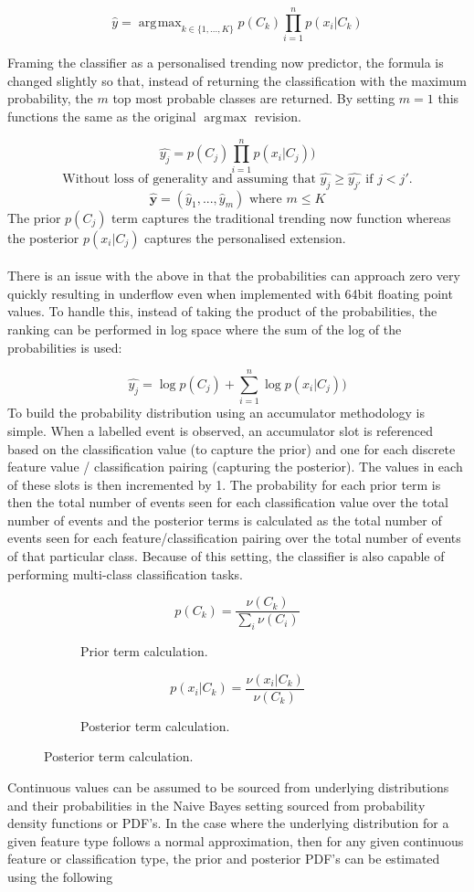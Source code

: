 \documentclass[a4paper,11pt]{scrreprt}
\DeclareMathOperator*{\argmax}{\arg\!\max}
\begin{document}
\[\hat{y}=\argmax_{k \in \{1,...,K\}} p(C_k)\prod_{i=1}^n p(x_i | C_k)\]

Framing the classifier as a personalised trending now predictor, the formula is changed slightly so that, instead of returning the classification with the maximum probability, the \(m\) top most probable classes are returned. By setting \(m=1\) this functions the same as the original \(\argmax\) revision. 

\[\hat{y_j}= p(C_j)\prod_{i=1}^n p(x_i | C_j))\]
\[\text{Without loss of generality and assuming that }  \hat{y_j} \geq \hat{y_{j'}} \text{ if } j < j'.\]
\[\mathbf{\hat{y}} = (\hat{y}_1, ..., \hat{y}_m) \text{ where } m \leq K\]
The prior \(p(C_j)\) term captures the traditional trending now function whereas the posterior \(p(x_i | C_j)\) captures the personalised extension.\\\\ There is an issue with the above in that the probabilities can approach zero very quickly resulting in underflow even when implemented with 64bit floating point values. To handle this, instead of taking the product of the probabilities, the ranking can be performed in log space where the sum of the log of the probabilities is used:

\[\hat{y_j}= \log p(C_j) + \sum_{i=1}^n \log p(x_i | C_j))\]
To build the probability distribution using an accumulator methodology is simple. When a labelled event is observed, an accumulator slot is referenced based on the classification value (to capture the prior) and one for each discrete feature value / classification pairing (capturing the posterior). The values in each of these slots is then incremented by 1. The probability for each prior term is then the total number of events seen for each classification value over the total number of events and the posterior terms is calculated as the total number of events seen for each feature/classification pairing over the total number of events of that particular class. Because of this setting, the classifier is also capable of performing multi-class classification tasks.

\begin{figure}[h!]
\begin{subfigure}[t]{2 in}
\[p(C_k) = \frac{\nu(C_k)}{\sum_{i} \nu(C_i)}\]
\caption{Prior term calculation.}
\end{subfigure}
\begin{subfigure}[t]{2 in}
\[p(x_i | C_k) = \frac{\nu(x_i | C_k)}{\nu(C_k)}\]
\caption{Posterior term calculation.}
\end{subfigure}
\end{figure}
Continuous values can be assumed to be sourced from underlying distributions and their probabilities in the Naive Bayes setting sourced from probability density functions or PDF's. In the case where the underlying distribution for a given feature type follows a normal approximation, then for any given continuous feature or classification type, the prior and posterior PDF's can be estimated using the following
\end{document}
